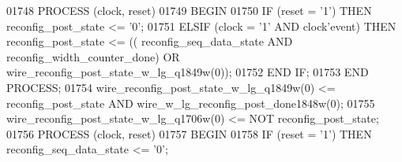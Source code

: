 \begin{DoxyCode}
{01748     \textcolor{keywordflow}{PROCESS} (clock, reset)
01749 \textcolor{vhdlkeyword}{    BEGIN}
01750         \textcolor{keywordflow}{IF} \textcolor{vhdlchar}{(}\textcolor{vhdlchar}{reset} \textcolor{vhdlchar}{=} \textcolor{vhdlchar}{'}\textcolor{vhdllogic}{}\textcolor{vhdllogic}{1}\textcolor{vhdlchar}{'}\textcolor{vhdlchar}{)} \textcolor{keywordflow}{THEN} \textcolor{vhdlchar}{reconfig_post_state} \textcolor{vhdlchar}{<=} \textcolor{vhdlchar}{'}\textcolor{vhdllogic}{}\textcolor{vhdllogic}{0}\textcolor{vhdlchar}{'};
01751         \textcolor{keywordflow}{ELSIF} \textcolor{vhdlchar}{(}\textcolor{vhdlchar}{clock} \textcolor{vhdlchar}{=} \textcolor{vhdlchar}{'}\textcolor{vhdllogic}{}\textcolor{vhdllogic}{1}\textcolor{vhdlchar}{'} \textcolor{keywordflow}{AND} \textcolor{vhdlchar}{clock}\textcolor{vhdlchar}{'}\textcolor{vhdlkeyword}{event}\textcolor{vhdlchar}{)} \textcolor{keywordflow}{THEN} \textcolor{vhdlchar}{reconfig_post_state} \textcolor{vhdlchar}{<=} \textcolor{vhdlchar}{(}\textcolor{vhdlchar}{(}\textcolor{vhdlchar}{
      reconfig_seq_data_state} \textcolor{keywordflow}{AND} \textcolor{vhdlchar}{reconfig_width_counter_done}\textcolor{vhdlchar}{)} \textcolor{keywordflow}{OR} \textcolor{vhdlchar}{
      wire_reconfig_post_state_w_lg_q1849w}\textcolor{vhdlchar}{(}\textcolor{vhdllogic}{}\textcolor{vhdllogic}{0}\textcolor{vhdlchar}{)}\textcolor{vhdlchar}{)};
01752         \textcolor{keywordflow}{END} \textcolor{keywordflow}{IF};
01753     \textcolor{keywordflow}{END} \textcolor{keywordflow}{PROCESS};
01754     \textcolor{vhdlchar}{wire_reconfig_post_state_w_lg_q1849w}\textcolor{vhdlchar}{(}\textcolor{vhdllogic}{}\textcolor{vhdllogic}{0}\textcolor{vhdlchar}{)} \textcolor{vhdlchar}{<=} \textcolor{vhdlchar}{reconfig_post_state} \textcolor{keywordflow}{AND} \textcolor{vhdlchar}{
      wire_w_lg_reconfig_post_done1848w}\textcolor{vhdlchar}{(}\textcolor{vhdllogic}{}\textcolor{vhdllogic}{0}\textcolor{vhdlchar}{)};
01755     \textcolor{vhdlchar}{wire_reconfig_post_state_w_lg_q1706w}\textcolor{vhdlchar}{(}\textcolor{vhdllogic}{}\textcolor{vhdllogic}{0}\textcolor{vhdlchar}{)} \textcolor{vhdlchar}{<=} \textcolor{keywordflow}{NOT} \textcolor{vhdlchar}{reconfig_post_state};
01756     \textcolor{keywordflow}{PROCESS} (clock, reset)
01757 \textcolor{vhdlkeyword}{    BEGIN}
01758         \textcolor{keywordflow}{IF} \textcolor{vhdlchar}{(}\textcolor{vhdlchar}{reset} \textcolor{vhdlchar}{=} \textcolor{vhdlchar}{'}\textcolor{vhdllogic}{}\textcolor{vhdllogic}{1}\textcolor{vhdlchar}{'}\textcolor{vhdlchar}{)} \textcolor{keywordflow}{THEN} \textcolor{vhdlchar}{reconfig_seq_data_state} \textcolor{vhdlchar}{<=} \textcolor{vhdlchar}{'}\textcolor{vhdllogic}{}\textcolor{vhdllogic}{0}\textcolor{vhdlchar}{'};
}
\end{DoxyCode}
